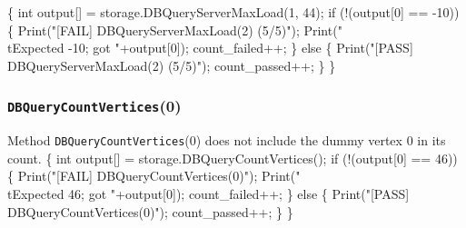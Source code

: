 \documentclass{article}
\def\nwendcode{\endtrivlist \endgroup}
\let\nwdocspar=\par
\begin{document}
\nwenddocs{}\endmoddef{}
\{
  int output[] = storage.DBQueryServerMaxLoad(1, 44);
  if (!(output[0] == -10)) \{
    Print("[FAIL] DBQueryServerMaxLoad(2) (5/5)");
    Print("\\tExpected -10; got "+output[0]);
    count_failed++;
  \} else \{
    Print("[PASS] DBQueryServerMaxLoad(2) (5/5)");
    count_passed++;
  \}
\}
\nwendcode{}\nwdocspar
\subsubsection{{\tt{}DBQueryCountVertices}(0)}
Method {\tt{}DBQueryCountVertices}(0) does not include the dummy vertex 0 in its
count.
\nwenddocs{}\endmoddef{}
\{
  int output[] = storage.DBQueryCountVertices();
  if (!(output[0] == 46)) \{
    Print("[FAIL] DBQueryCountVertices(0)");
    Print("\\tExpected 46; got "+output[0]);
    count_failed++;
  \} else \{
    Print("[PASS] DBQueryCountVertices(0)");
    count_passed++;
  \}
\}
\nwendcode{}\nwdocspar
\end{document}
